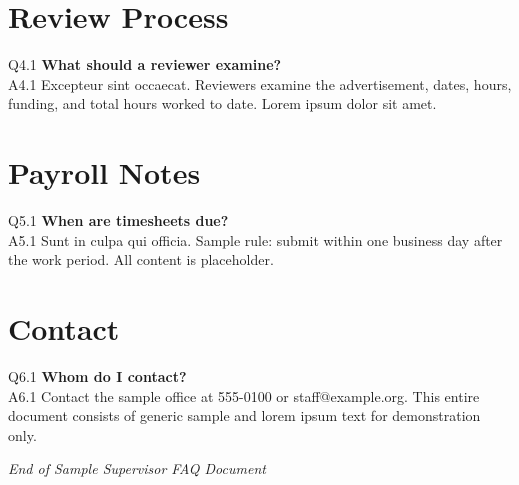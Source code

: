\documentclass[11pt,a4paper,oneside]{article}
\begin{document}
\section{Review Process}
\noindent Q4.1 \textbf{What should a reviewer examine?}\\
\noindent A4.1 Excepteur sint occaecat. Reviewers examine the advertisement, dates, hours, funding, and total hours worked to date. Lorem ipsum dolor sit amet.\vspace{6pt}

\section{Payroll Notes}
\noindent Q5.1 \textbf{When are timesheets due?}\\
\noindent A5.1 Sunt in culpa qui officia. Sample rule: submit within one business day after the work period. All content is placeholder.\vspace{6pt}

\section{Contact}
\noindent Q6.1 \textbf{Whom do I contact?}\\
\noindent A6.1 Contact the sample office at 555-0100 or staff@example.org. This entire document consists of generic sample and lorem ipsum text for demonstration only.\vspace{6pt}

\vspace{1cm}

\noindent\hrulefill

\noindent\textit{End of Sample Supervisor FAQ Document}
\end{document}
